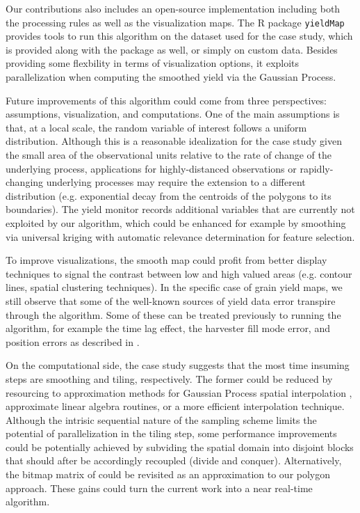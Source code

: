  Our contributions also
includes an open-source implementation including both the processing
rules as well as the visualization maps. The R package
\texttt{yieldMap} provides tools to run this algorithm on the dataset
used for the case study, which is provided along with the package as
well, or simply on custom data. Besides providing some flexbility in
terms of visualization options, it exploits parallelization when
computing the smoothed yield via the Gaussian Process.

 Future improvements of this
algorithm could come from three perspectives: assumptions,
visualization, and computations. One of the main assumptions is that,
at a local scale, the random variable of interest follows a uniform
distribution. Although this is a reasonable idealization for the case
study given the small area of the observational units relative to the
rate of change of the underlying process, applications for
highly-distanced observations or rapidly-changing underlying processes
may require the extension to a different distribution
(e.g. exponential decay from the centroids of the polygons to its
boundaries). The yield monitor records additional variables that are
currently not exploited by our algorithm, which could be enhanced for
example by smoothing via universal kriging with automatic relevance
determination for feature selection.

 To improve visualizations,
the smooth map could profit from better display techniques to signal
the contrast between low and high valued areas (e.g. contour lines,
spatial clustering techniques). In the specific case of grain yield
maps, we still observe that some of the well-known sources of yield
data error transpire through the algorithm. Some of these can be
treated previously to running the algorithm, for example the time lag
effect, the harvester fill mode error, and position errors as
described in \cite{Blackmore1999}.

 On the computational side, the
case study suggests that the most time insuming steps are smoothing
and tiling, respectively. The former could be reduced by resourcing to
approximation methods for Gaussian Process spatial interpolation
\citep{Shi2007,Cressie2008,Katzfuss2011,Nguyen2012,Nguyen2014},
approximate linear algebra routines, or a more efficient interpolation
technique. Although the intrisic sequential nature of the sampling
scheme limits the potential of parallelization in the tiling step,
some performance improvements could be potentially achieved by
subviding the spatial domain into disjoint blocks that should after be
accordingly recoupled (divide and conquer). Alternatively, the bitmap
matrix of \cite{Han1997} could be revisited as an approximation to our
polygon approach. These gains could turn the current work into a near
real-time algorithm.

